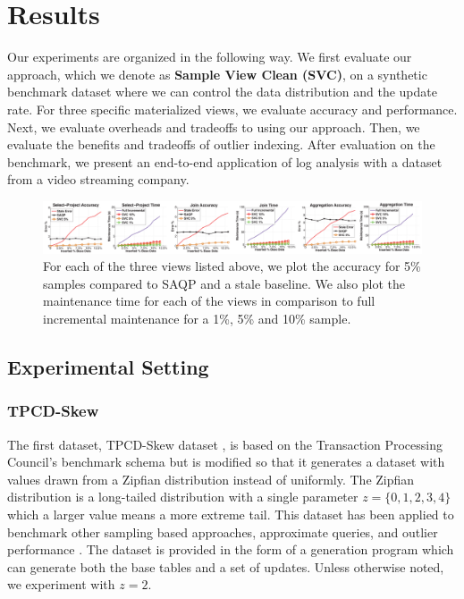 \section{Results}
\label{exp}
Our experiments are organized in the following way.
We first evaluate our approach, which we denote as \textbf{Sample View Clean (SVC)}, on a synthetic benchmark dataset where we can control the data distribution and the update rate.
For three specific materialized views, we evaluate accuracy and performance.
Next, we evaluate overheads and tradeoffs to using our approach.
Then, we evaluate the benefits and tradeoffs of outlier indexing.
After evaluation on the benchmark, we present an end-to-end application of log analysis with a dataset from a video streaming company.

\begin{figure}[ht!]
\hspace{-5.5em}
 \includegraphics[scale=0.19]{exp/exp2-full.eps}
 \caption{For each of the three views listed above, we plot the accuracy for 5\% samples compared to SAQP and a stale baseline. We also plot the maintenance time for each of the views in comparison to full incremental maintenance for a 1\%, 5\% and 10\% sample. \label{exp2update} }
\end{figure}

\subsection{Experimental Setting}
\subsubsection{TPCD-Skew}
The first dataset, TPCD-Skew dataset \cite{tpcdskew}, is based on the Transaction Processing Council's benchmark
schema but is modified so that it generates a dataset with values drawn from a Zipfian distribution instead of uniformly.
The Zipfian distribution \cite{mitzenmacher2004brief} is a long-tailed distribution with a single parameter $z=\{0,1,2,3,4\}$ which a larger
value means a more extreme tail.
This dataset has been applied to benchmark other sampling based approaches, approximate queries, and outlier performance \cite{chaudhuri2001overcoming, agrawal2005database}.
The dataset is provided in the form of a generation program which can generate both the base tables and a set of updates.
Unless otherwise noted, we experiment with $z=2$.


